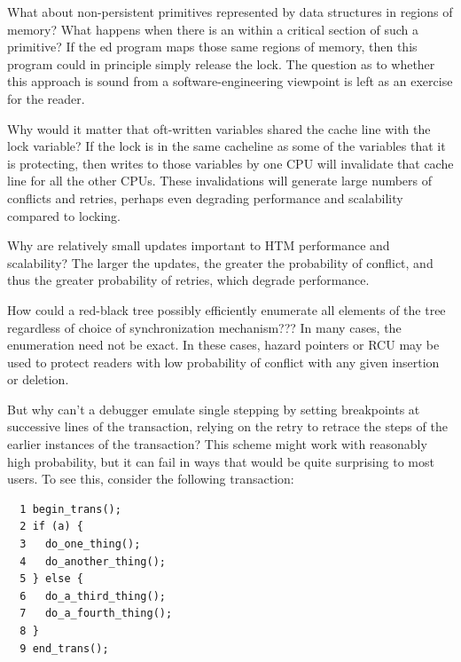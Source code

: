 \QuickQ{}
	What about non-persistent primitives represented by data
	structures in  regions of memory?
	What happens when there is an  within a critical
	section of such a primitive?
\QuickA{}
	If the ed program maps those same regions of
	memory, then this program could in principle simply release
	the lock.
	The question as to whether this approach is sound from a
	software-engineering viewpoint is left as an exercise for
	the reader.

\QuickQ{}
	Why would it matter that oft-written variables shared the cache
	line with the lock variable?
\QuickA{}
	If the lock is in the same cacheline as some of the variables
	that it is protecting, then writes to those variables by one CPU
	will invalidate that cache line for all the other CPUs.
	These invalidations will
	generate large numbers of conflicts and retries, perhaps even
	degrading performance and scalability compared to locking.

\QuickQ{}
	Why are relatively small updates important to HTM performance
	and scalability?
\QuickA{}
	The larger the updates, the greater the probability of conflict,
	and thus the greater probability of retries, which degrade
	performance.

\QuickQ{}
	How could a red-black tree possibly efficiently enumerate all
	elements of the tree regardless of choice of synchronization
	mechanism???
\QuickA{}
	In many cases, the enumeration need not be exact.
	In these cases, hazard pointers or RCU may be used to protect
	readers with low probability of conflict with any given insertion
	or deletion.

\QuickQ{}
	But why can't a debugger emulate single stepping by setting
	breakpoints at successive lines of the transaction, relying
	on the retry to retrace the steps of the earlier instances
	of the transaction?
\QuickA{}
	This scheme might work with reasonably high probability, but it
	can fail in ways that would be quite surprising to most users.
	To see this, consider the following transaction:

	\vspace{5pt}
	\begin{minipage}[t]{\columnwidth}
	\small
\begin{verbatim}
  1 begin_trans();
  2 if (a) {
  3   do_one_thing();
  4   do_another_thing();
  5 } else {
  6   do_a_third_thing();
  7   do_a_fourth_thing();
  8 }
  9 end_trans();
\end{verbatim}
	\end{minipage}
	\vspace{5pt}


